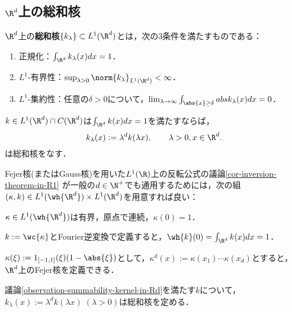 \documentclass[uplatex,dvipdfmx]{jsreport}
\begin{document}
\subsection{$\R^d$上の総和核}

\begin{definition}
    $\R^d$上の\textbf{総和核}$\{k_\lambda\}\subset L^1(\R^d)$とは，次の3条件を満たすものである：
    \begin{enumerate}
        \item 正規化：$\int_{\R^d}k_\lambda(x)dx=1$．
        \item $L^1$-有界性：$\sup_{\lambda>0}\norm{k_\lambda}_{L^1(\R^d)}<\infty$．
        \item $L^1$-集約性：任意の$\delta>0$について，$\lim_{\lambda\to\infty}\int_{\abs{x}\ge\delta}abs{k_\lambda(x)}dx=0$．
    \end{enumerate}
\end{definition}

\begin{proposition}[総和核の構成]\label{prop-construction-of-summability-kernel-on-Rd}
    $k\in L^1(\R^d)\cap C(\R^d)$は$\int_{\R^d}k(x)dx=1$を満たすならば，
    \[k_\lambda(x):=\lambda^dk(\lambda x),\qquad \lambda>0,x\in\R^d.\]
    は総和核をなす．
\end{proposition}

\begin{observation}\label{observation-summability-kernel-in-Rd}
    Fejer核(またはGauss核)を用いた$L^1(\R)$上の反転公式の議論\ref{cor-inversion-theorem-in-R1}
    が一般の$d\in\N^+$でも通用するためには，次の組$(\kappa,k)\in L^1(\wh{\R^d})\times L^1(\R^d)$を用意すれば良い：
    \begin{enumerate}[{[S}1{]}]
        \item $\kappa\in L^1(\wh{\R^d})$は有界，原点で連続，$\kappa(0)=1$．
        \item $k:=\wc{\kappa}$とFourier逆変換で定義すると，$\wh{k}(0)=\int_{\R^d}k(x)dx=1$．
    \end{enumerate}
\end{observation}


\begin{example}[$\R^d$上のFejer核]
    $\kappa(\xi):=1_{[-1,1]}(\xi)(1-\abs{\xi})$として，$\kappa^d(x):=\kappa(x_1)\cdots\kappa(x_d)$とすると，$\R^d$上のFejer核を定義できる．
\end{example}

\begin{proposition}
    議論\ref{observation-summability-kernel-in-Rd}を満たす$k$について，$k_\lambda(x):=\lambda^dk(\lambda x)\;(\lambda>0)$は総和核を定める．
\end{proposition}
\end{document}
